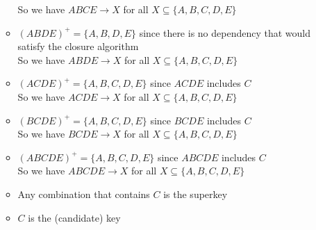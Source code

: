 \documentclass[12pt]{article}
\begin{document}
\begin{enumerate}
\begin{itemize}
                So we have $ABCE \longrightarrow X$ for all $X \subseteq \{A, B,
                C, D, E\}$
          \item $(ABDE)^+ = \{A, B, D, E\}$ since there is no dependency that
                would satisfy the closure algorithm \\
                So we have $ABDE \longrightarrow X$ for all $X \subseteq \{A, B,
                C, D, E\}$
          \item $(ACDE)^+ = \{A, B, C, D, E\}$ since $ACDE$ includes $C$ \\
                So we have $ACDE \longrightarrow X$ for all $X \subseteq \{A, B,
                C, D, E\}$
          \item $(BCDE)^+ = \{A, B, C, D, E\}$ since $BCDE$ includes $C$ \\
                So we have $BCDE \longrightarrow X$ for all $X \subseteq \{A, B,
                C, D, E\}$
          \item $(ABCDE)^+ = \{A, B, C, D, E\}$ since $ABCDE$ includes $C$ \\
                So we have $ABCDE \longrightarrow X$ for all $X \subseteq \{A,
                B, C, D, E\}$

          \item Any combination that contains $C$ is the superkey
          \item $C$ is the (candidate) key
        \end{itemize}
  \ \\


\end{enumerate}
\end{document}
